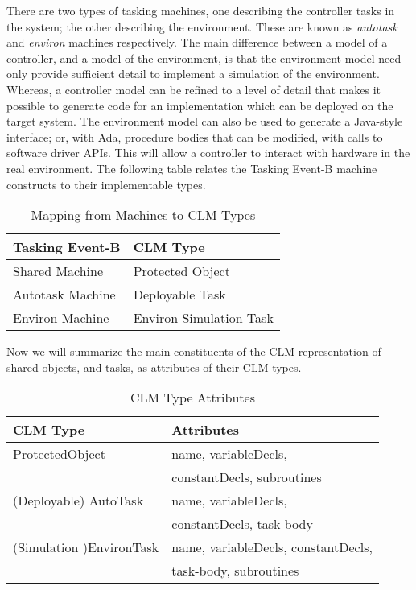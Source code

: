 There are two types of tasking machines, one describing the controller tasks in the system; the other describing the environment. These are known as \emph{autotask} and \emph{environ} machines respectively. The main difference between a model of a controller, and a model of the environment, is that the environment model need only provide sufficient detail to implement a simulation of the environment. Whereas, a controller model can be refined to a level of detail that makes it possible to generate code for an implementation which can be deployed on the target system. The environment model can also be used to generate a Java-style interface; or, with Ada, procedure bodies that can be modified, with calls to software driver APIs. This will allow a controller to interact with hardware in the real environment. The following table relates the Tasking Event-B machine constructs to their implementable types.
%
\begin{table}[h]
\begin{center}
\begin{tabular}{l|l}
Tasking Event-B & CLM Type \\ 
\hline
Shared Machine &	Protected Object\\
Autotask Machine & Deployable Task\\
Environ Machine &	Environ Simulation Task
\end{tabular}
\end{center}
\caption{Mapping from Machines to CLM Types}\label{CLMTypes}
\end{table}

Now we will summarize the main constituents of the CLM representation of shared objects, and tasks, as attributes of their CLM types. 
%
\begin{table}[h]
\begin{center}
\begin{tabular}{l|l}
CLM Type & Attributes \\ 
\hline
ProtectedObject 	& name, variableDecls,\\ 
				& constantDecls, subroutines\\
(Deployable) AutoTask 	& name, variableDecls, \\ 
				& constantDecls, task-body\\
(Simulation )EnvironTask & name, variableDecls, constantDecls, \\
				& task-body, subroutines\\
\end{tabular}
\end{center}
\caption{CLM Type Attributes}\label{CLMTypeAttributes}
\end{table}
 
